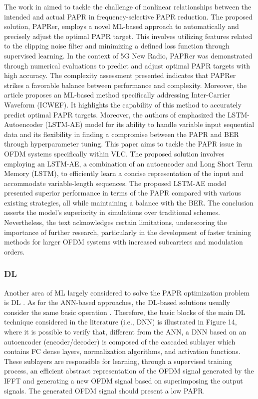 \documentclass[conference]{IEEEtran}
\begin{document}
The work in \cite{b135} aimed to tackle the challenge of nonlinear relationships between the intended and actual PAPR in frequency-selective PAPR reduction. The proposed solution, PAPRer, employs a novel ML-based approach to automatically and precisely adjust the optimal PAPR target. This involves utilizing features related to the clipping noise filter and minimizing a defined loss function through supervised learning. In the context of 5G New Radio, PAPRer was demonstrated through numerical evaluations to predict and adjust optimal PAPR targets with high accuracy. The complexity assessment presented indicates that PAPRer strikes a favorable balance between performance and complexity. Moreover, the article proposes an ML-based method specifically addressing Inter-Carrier Waveform (ICWEF). It highlights the capability of this method to accurately predict optimal PAPR targets. Moreover, the authors of \cite{b146} emphasized the LSTM-Autoencoder (LSTM-AE) model for its ability to handle variable input sequential data and its flexibility in finding a compromise between the PAPR and BER through hyperparameter tuning. This paper aims to tackle the PAPR issue in OFDM systems specifically within VLC. The proposed solution involves employing an LSTM-AE, a combination of an autoencoder and Long Short Term Memory (LSTM), to efficiently learn a concise representation of the input and accommodate variable-length sequences. The proposed LSTM-AE model presented superior performance in terms of the PAPR compared with various existing strategies, all while maintaining a balance with the BER. The conclusion asserts the model's superiority in simulations over traditional schemes. Nevertheless, the text acknowledges certain limitations, underscoring the importance of further research, particularly in the development of faster training methods for larger OFDM systems with increased subcarriers and modulation orders.

\subsubsection{DL \cite{b147, b148, b149, b150, b151, b152, b153, b154}}
Another area of ML largely considered to solve the PAPR optimization problem is DL \cite{b147, b148, b149, b150, b151, b152, b153, b154}. As for the ANN-based approaches, the DL-based solutions usually consider the same basic operation \cite{b147, b148, b149, b150, b151, b152, b153, b154}. Therefore, the basic blocks of the main DL technique considered in the literature (i.e., DNN) is illustrated in Figure 14, where it is possible to verify that, different from the ANN, a DNN based on an autoencoder (encoder/decoder) is composed of the cascaded sublayer which contains FC dense layers, normalization algorithms, and activation functions. These sublayers are responsible for learning, through a supervised training process, an efficient abstract representation of the OFDM signal generated by the IFFT and generating a new OFDM signal based on superimposing the output signals. The generated OFDM signal should present a low PAPR.
\end{document}
